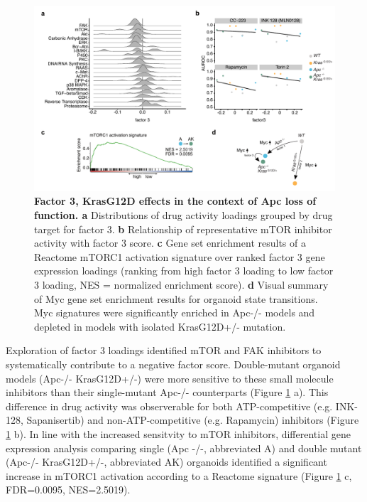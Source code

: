 \begin{flushleft}
\begin{figure}[h]
\centering
\includegraphics[scale=0.75,
                keepaspectratio]{figures/adenomaprofiling/pdf/fig_4_1.pdf}
\caption{\textbf{Factor 3, KrasG12D effects in the context of Apc loss of function. a} Distributions of drug activity loadings grouped by drug target for factor 3. \textbf{b} Relationship of representative mTOR inhibitor activity with factor 3 score. \textbf{c} Gene set enrichment results of a Reactome mTORC1 activation signature over ranked factor 3 gene expression loadings (ranking from high factor 3 loading to low factor 3 loading, NES = normalized enrichment score). \textbf{d} Visual summary of Myc gene set enrichment results for organoid state transitions. Myc signatures were significantly enriched in Apc-/- models and depleted in models with isolated KrasG12D+/- mutation.}
\label{fig_300}
\end{figure}
\bigbreak

Exploration of factor 3 loadings identified mTOR and FAK inhibitors to systematically contribute to a negative factor score. Double-mutant organoid models (Apc-/- KrasG12D+/-) were more sensitive to these small molecule inhibitors than their single-mutant Apc-/- counterparts (Figure \ref{fig_300} a). This difference in drug activity was observerable for both ATP-competitive (e.g. INK-128, Sapanisertib) and non-ATP-competitive (e.g. Rapamycin) inhibitors (Figure \ref{fig_300} b). In line with the increased sensitvity to mTOR inhibitors, differential gene expression analysis comparing single (Apc -/-, abbreviated A) and double mutant (Apc-/- KrasG12D+/-, abbreviated AK) organoids identified a significant increase in mTORC1 activation according to a Reactome signature (Figure \ref{fig_300} c, FDR=0.0095, NES=2.5019). 


\end{flushleft}
